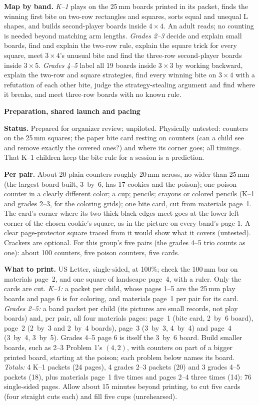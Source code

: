 \documentclass[11pt]{article}
\newcommand{\head}[1]{\par\textbf{\large #1}\par}
\newcommand{\pos}[1]{$(#1)$}
\begin{document}
\textbf{Map by band.} \emph{K--1} plays on the 25\,mm boards printed in its packet, finds the winning first bite on two-row rectangles and squares, sorts equal and unequal L shapes, and builds second-player boards inside $4\times4$. An adult reads; no counting is needed beyond matching arm lengths. \emph{Grades 2--3} decide and explain small boards, find and explain the two-row rule, explain the square trick for every square, meet $3\times4$'s unusual bite and find the three-row second-player boards inside $3\times5$. \emph{Grades 4--5} label all 19 boards inside $3\times3$ by working backward, explain the two-row and square strategies, find every winning bite on $3\times4$ with a refutation of each other bite, judge the strategy-stealing argument and find where it breaks, and meet three-row boards with no known rule.
\newpage
\head{Preparation, shared launch and pacing}
\textbf{Status.} Prepared for organizer review; unpiloted. Physically untested: counters on the 25\,mm squares; the paper bite card resting on counters (can a child see and remove exactly the covered ones?) and where its corner goes; all timings. That K--1 children keep the bite rule for a session is a prediction.

\textbf{Per pair.} About 20 plain counters roughly 20\,mm across, no wider than 25\,mm (the largest board built, 3~by~6, has 17 cookies and the poison); one poison counter in a clearly different color; a cup; pencils; crayons or colored pencils (K--1 and grades 2--3, for the coloring grids); one bite card, cut from materials page~1. The card's corner where its two thick black edges meet goes at the lower-left corner of the chosen cookie's square, as in the picture on every band's page 1. A clear page-protector square traced from it would show what it covers (untested). Crackers are optional. For this group's five pairs (the grades 4--5 trio counts as one): about 100 counters, five poison counters, five cards.

\textbf{What to print.} US Letter, single-sided, at 100\%; check the 100\,mm bar on materials page~2, and one square of landscape page~4, with a ruler. Only the cards are cut. \emph{K--1:} a packet per child, whose pages 1--5 are the 25\,mm play boards and page 6 is for coloring, and materials page~1 per pair for its card. \emph{Grades 2--5:} a band packet per child (its pictures are small records, not play boards) and, per pair, all four materials pages: page~1 (bite card, 2~by~6 board), page~2 (2~by~3 and 2~by~4 boards), page~3 (3~by~3, 4~by~4) and page~4 (3~by~4, 3~by~5). Grades 4--5 page 6 is itself the 3~by~6 board. Build smaller boards, such as 2--3 Problem 1's \pos{4,2}, with counters on part of a bigger printed board, starting at the poison; each problem below names its board. \emph{Totals:} 4 K--1 packets (24 pages), 4 grades 2--3 packets (20) and 3 grades 4--5 packets (18), plus materials page~1 five times and pages 2--4 three times (14): 76 single-sided pages. Allow about 15 minutes beyond printing, to cut five cards (four straight cuts each) and fill five cups (unrehearsed).
\end{document}
